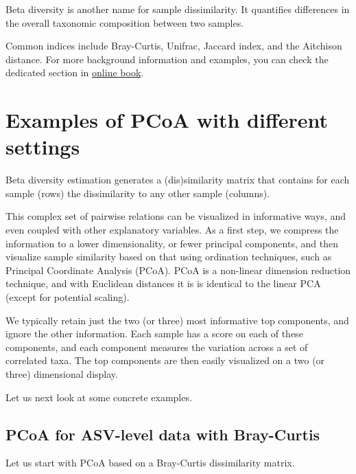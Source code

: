 \documentclass[
  oneside]{book}
\begin{document}
Beta diversity is another name for sample dissimilarity. It quantifies
differences in the overall taxonomic composition between two samples.

Common indices include Bray-Curtis, Unifrac, Jaccard index, and the
Aitchison distance. For more background information
and examples, you can check the dedicated section in \href{https://microbiome.github.io/OMA/microbiome-diversity.html\#beta-diversity}{online
book}.

\hypertarget{examples-of-pcoa-with-different-settings}{%
\section{Examples of PCoA with different settings}\label{examples-of-pcoa-with-different-settings}}

Beta diversity estimation generates a (dis)similarity matrix that
contains for each sample (rows) the dissimilarity to any other sample
(columns).

This complex set of pairwise relations can be visualized in
informative ways, and even coupled with other explanatory
variables. As a first step, we compress the information to a lower
dimensionality, or fewer principal components, and then visualize
sample similarity based on that using ordination techniques, such as
Principal Coordinate Analysis (PCoA). PCoA is a non-linear dimension
reduction technique, and with Euclidean distances it is is identical
to the linear PCA (except for potential scaling).

We typically retain just the two (or three) most informative top
components, and ignore the other information. Each sample has a score
on each of these components, and each component measures the variation
across a set of correlated taxa. The top components are then easily
visualized on a two (or three) dimensional display.

Let us next look at some concrete examples.

\hypertarget{pcoa-for-asv-level-data-with-bray-curtis}{%
\subsection{PCoA for ASV-level data with Bray-Curtis}\label{pcoa-for-asv-level-data-with-bray-curtis}}

Let us start with PCoA based on a Bray-Curtis dissimilarity matrix.
\end{document}
